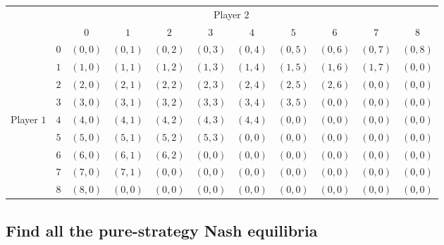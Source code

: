 \documentclass{article}
\begin{document}
\begin{table}
\setlength{\extrarowheight}{2pt}
\begin{tabular}{cc|c|c|c|c|c|c|c|c|c|}
  & \multicolumn{3}{c}{} & \multicolumn{4}{c}{Player $2$} & \multicolumn{3}{c}{} \\
  & \multicolumn{1}{c}{} & \multicolumn{1}{c}{$0$} & \multicolumn{1}{c}{$1$} & \multicolumn{1}{c}{$2$} 
  & \multicolumn{1}{c}{$3$} & \multicolumn{1}{c}{$4$} & \multicolumn{1}{c}{$5$} & \multicolumn{1}{c}{$6$} 
  & \multicolumn{1}{c}{$7$} & \multicolumn{1}{c}{$8$}  \\\cline{3-11}
            & $0$ & $(0,0)$ & $(0,1)$ & $(0,2)$ & $(0,3)$ & $(0,4)$ & $(0,5)$ & $(0,6)$ & $(0,7)$ & $(0,8)$ \\ \cline{3-11}  
            & $1$ & $(1,0)$ & $(1,1)$ & $(1,2)$ & $(1,3)$ & $(1,4)$ & $(1,5)$ & $(1,6)$ & $(1,7)$ & $(0,0)$ \\ \cline{3-11}
  			& $2$ & $(2,0)$ & $(2,1)$ & $(2,2)$ & $(2,3)$ & $(2,4)$ & $(2,5)$ & $(2,6)$ & $(0,0)$ & $(0,0)$\\\cline{3-11}
            & $3$ & $(3,0)$ & $(3,1)$ & $(3,2)$ & $(3,3)$ & $(3,4)$ & $(3,5)$ & $(0,0)$ & $(0,0)$ & $(0,0)$ \\\cline{3-11}
Player $1$  & $4$ & $(4,0)$ & $(4,1)$ & $(4,2)$ & $(4,3)$ & $(4,4)$ & $(0,0)$ & $(0,0)$ & $(0,0)$ & $(0,0)$ \\\cline{3-11}
            & $5$ & $(5,0)$ & $(5,1)$ & $(5,2)$ & $(5,3)$ & $(0,0)$ & $(0,0)$ & $(0,0)$ & $(0,0)$ & $(0,0)$ \\\cline{3-11}
            & $6$ & $(6,0)$ & $(6,1)$ & $(6,2)$ & $(0,0)$ & $(0,0)$ & $(0,0)$ & $(0,0)$ & $(0,0)$ & $(0,0)$ \\\cline{3-11}
            & $7$ & $(7,0)$ & $(7,1)$ & $(0,0)$ & $(0,0)$ & $(0,0)$ & $(0,0)$ & $(0,0)$ & $(0,0)$ & $(0,0)$ \\\cline{3-11}
            & $8$ & $(8,0)$ & $(0,0)$ & $(0,0)$ & $(0,0)$ & $(0,0)$ & $(0,0)$ & $(0,0)$ & $(0,0)$ & $(0,0)$ \\\cline{3-11}

\end{tabular}
\end{table}



%
\subsection{Find all the pure-strategy Nash equilibria}
\end{document}
